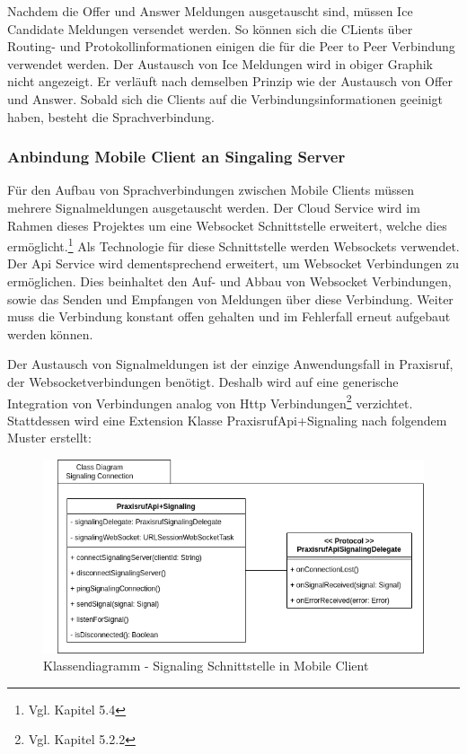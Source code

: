 Nachdem die Offer und Answer Meldungen ausgetauscht sind, müssen Ice Candidate Meldungen versendet werden.
So können sich die CLients über Routing- und Protokollinformationen einigen die für die Peer to Peer Verbindung verwendet werden.
Der Austausch von Ice Meldungen wird in obiger Graphik nicht angezeigt.
Er verläuft nach demselben Prinzip wie der Austausch von Offer und Answer.
Sobald sich die Clients auf die Verbindungsinformationen geeinigt haben, besteht die Sprachverbindung.

\clearpage

\subsubsection{Anbindung Mobile Client an Singaling Server}

Für den Aufbau von Sprachverbindungen zwischen Mobile Clients müssen mehrere Signalmeldungen ausgetauscht werden.
Der Cloud Service wird im Rahmen dieses Projektes um eine Websocket Schnittstelle erweitert, welche dies ermöglicht.\footnote{Vgl. Kapitel 5.4}
Als Technologie für diese Schnittstelle werden Websockets verwendet.
Der Api Service wird dementsprechend erweitert, um Websocket Verbindungen zu ermöglichen.
Dies beinhaltet den Auf- und Abbau von Websocket Verbindungen, sowie das Senden und Empfangen von Meldungen über diese Verbindung.
Weiter muss die Verbindung konstant offen gehalten und im Fehlerfall erneut aufgebaut werden können.

Der Austausch von Signalmeldungen ist der einzige Anwendungsfall in Praxisruf, der Websocketverbindungen benötigt.
Deshalb wird auf eine generische Integration von Verbindungen analog von Http Verbindungen\footnote{Vgl. Kapitel 5.2.2} verzichtet.
Stattdessen wird eine Extension Klasse PraxisrufApi+Signaling nach folgendem Muster erstellt:

\begin{figure}[h]
    \centering
    \begin{minipage}[b]{0.9\textwidth}
        \includegraphics[width=\textwidth]{graphics/diagramms/Class_Mobile_Client_Signaling_Connection}
        \caption{Klassendiagramm - Signaling Schnittstelle in Mobile Client}
    \end{minipage}
\end{figure}

